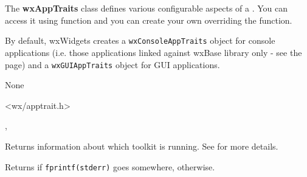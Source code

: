 
\section{}\label{wxapptraits}

The {\bf wxAppTraits} class defines various configurable aspects of a .
You can access it using  function and you can
create your own  overriding the
 function.

By default, wxWidgets creates a {\tt wxConsoleAppTraits} object for console applications
(i.e. those applications linked against wxBase library only - see the
 page) and a {\tt wxGUIAppTraits} object for GUI
applications.


None


<wx/apptrait.h>


, 



\label{wxapptraitsgettoolkitinfo}


Returns information about which toolkit is running. See 
for more details.


\label{wxapptraitshasstderr}


Returns \true if {\tt fprintf(stderr)} goes somewhere, \false otherwise.



\label{wxapptraitsshowassertdialog}

